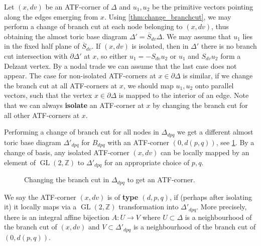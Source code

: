 \documentclass[12pt,a4paper,abstract=true,final]{scrartcl}
\DeclareMathOperator{\GL}{GL}
\begin{document}
Let $(x,dv)$ be an ATF-corner of $Δ$ and $u_1,u_2$ be the primitive vectors pointing along the edges emerging from $x$.
Using \cref{thm:change_branchcut}, we may perform a change of branch cut at each node belonging to $(x,dv)$, thus obtaining the almost toric base diagram $Δ' = \overline{S}_{dv}Δ$.
We may assume that $u_1$ lies in the fixed half plane of $\overline{S}_{dv}$.
If $(x,dv)$ is isolated, then in $Δ'$ there is no branch cut intersection with $∂Δ'$ at $x$, so either $u_1 = -S_{dv}u_2$ or $u_1$ and $S_{dv}u_2$ form a Delzant vertex.
By a nodal trade we can assume that the last case does not appear.
The case for non-isolated ATF-corners at $x ∈ ∂Δ$ is similar, if we change the branch cut at all ATF-corners at $x$, we should map $u_1,u_2$ onto parallel vectors, such that the vertex $x ∈ ∂Δ$ is mapped to the interior of an edge.
Note that we can always \textbf{isolate} an ATF-corner at $x$ by changing the branch cut for all other ATF-corners at $x$.

Performing a change of branch cut for all nodes in $Δ_{dpq}$ we get a different almost toric base diagram $Δ'_{dpq}$ for $B_{dpq}$ with an ATF-corner $(0,d(p,q))$, see \cref{fig:Bdpq_moment_image_alt}.
By a change of basis, any isolated ATF-corner $(x,dv)$ can be locally mapped by an element of $\GL(2,ℤ)$ to $Δ'_{dpq}$ for an appropriate choice of $p,q$.

\begin{figure}
\centering
{}   
\caption{Changing the branch cut in $Δ_{dpq}$ to get an ATF-corner.}
\label{fig:Bdpq_moment_image_alt}
\end{figure}

\begin{definition}
  \label{def:atf_corner_type}
  We say the ATF-corner $(x,dv)$ is of \textbf{type $(d,p,q)$}, if (perhaps after isolating it) it locally maps via a $\GL(2,ℤ)$ transformation into $Δ'_{dpq}$. More precisely, there is an integral affine bijection $A\colon U → V$ where $U ⊂ Δ$ is a neighbourhood of the branch cut of $(x,dv)$ and $V ⊂ Δ'_{dpq}$ is a neighbourhood of the branch cut of $(0,d(p,q))$.
\end{definition}
\end{document}
